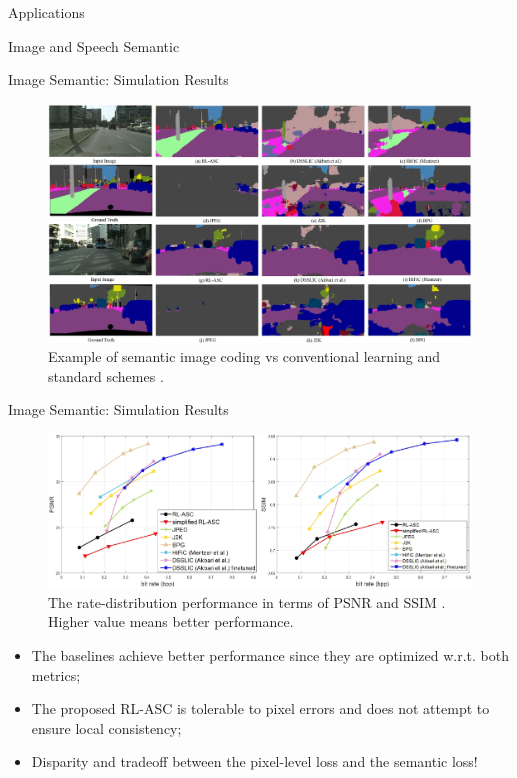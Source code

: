 \documentclass[presentation,mathserif,9pt]{beamer}
\begin{document}
\begin{section}{Applications}
\begin{subsection}{Image and Speech Semantic}
		\begin{frame}{Image Semantic: Simulation Results}
			\begin{figure}
				\includegraphics[width=\textwidth]{assets/semantic_image_example.jpg}
				\caption{Example of semantic image coding vs conventional learning and standard schemes \cite{Huang2022b}.}
			\end{figure}
		\end{frame}

		\begin{frame}{Image Semantic: Simulation Results}
			\begin{figure}
				\includegraphics[width=\textwidth]{assets/semantic_image_performance.jpg}
				\caption{The rate-distribution performance in terms of PSNR and SSIM \cite{Huang2022b}. Higher value means better performance.}
			\end{figure}
			\begin{itemize}
				\item The baselines achieve better performance since they are optimized w.r.t. both metrics;
				\item The proposed RL-ASC is tolerable to pixel errors and does not attempt to ensure local consistency;
				\item Disparity and tradeoff between the pixel-level loss and the semantic loss!
			\end{itemize}
		\end{frame}


\end{subsection}
\end{section}
\end{document}

